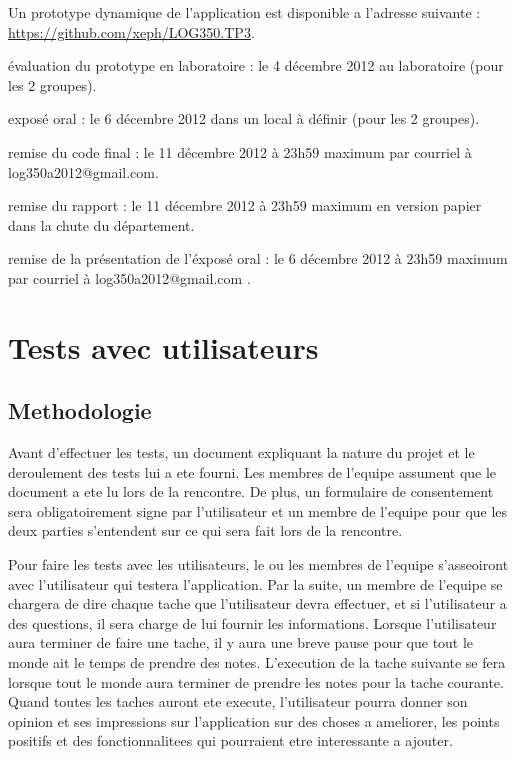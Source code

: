 \documentclass[letterpaper, oneside, 12pt, these, creativecommons]{thETS}
\begin{document}
Un prototype dynamique de l'application est disponible a l'adresse suivante : \\
\url{https://github.com/xeph/LOG350.TP3}.

évaluation du prototype en laboratoire  : le 4 décembre 2012 au laboratoire (pour les 2 groupes).

exposé oral  : le 6 décembre 2012 dans un local à définir (pour les 2 groupes).

remise du code final : le 11 décembre 2012 à 23h59 maximum par courriel à log350a2012@gmail.com.

remise du rapport :  le 11 décembre 2012 à 23h59 maximum en version papier dans la chute du département.

remise de la présentation de l’éxposé oral : le 6 décembre 2012 à 23h59 maximum par courriel à log350a2012@gmail.com .

\chapter{Tests avec utilisateurs}

\section{Methodologie}

Avant d'effectuer les tests, un document expliquant la nature du projet et le deroulement des tests lui a ete fourni. Les membres de l'equipe assument que le document a ete lu lors de la rencontre. De plus, un formulaire de consentement sera obligatoirement signe par l'utilisateur et un membre de l'equipe pour que les deux parties s'entendent sur ce qui sera fait lors de la rencontre.

Pour faire les tests avec les utilisateurs, le ou les membres de l'equipe s'asseoiront avec l'utilisateur qui testera l'application. Par la suite, un membre de l'equipe se chargera de dire chaque tache que l'utilisateur devra effectuer, et si l'utilisateur a des questions, il sera charge de lui fournir les informations. Lorsque l'utilisateur aura terminer de faire une tache, il y aura une breve pause pour que tout le monde ait le temps de prendre des notes. L'execution de la tache suivante se fera lorsque tout le monde aura terminer de prendre les notes pour la tache courante. Quand toutes les taches auront ete execute, l'utilisateur pourra donner son opinion et ses impressions sur l'application sur des choses a ameliorer, les points positifs et des fonctionnalitees qui pourraient etre interessante a ajouter.
\end{document}
